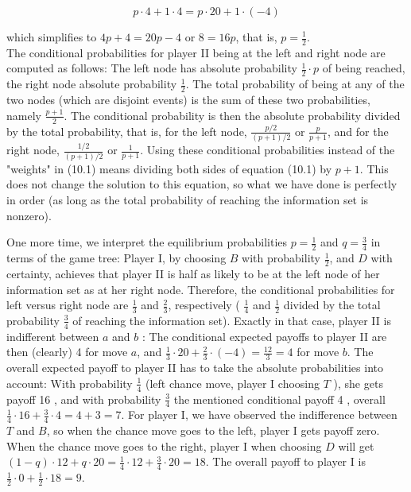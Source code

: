 \documentclass[12pt]{article}
\begin{document}
\begin{equation*}
p \cdot 4+1 \cdot 4=p \cdot 20+1 \cdot(-4) \tag{10.1}
\end{equation*}


which simplifies to $4 p+4=20 p-4$ or $8=16 p$, that is, $p=\frac{1}{2}$.\\
The conditional probabilities for player II being at the left and right node are computed as follows: The left node has absolute probability $\frac{1}{2} \cdot p$ of being reached,\\
the right node absolute probability $\frac{1}{2}$. The total probability of being at any of the two nodes (which are disjoint events) is the sum of these two probabilities, namely $\frac{p+1}{2}$. The conditional probability is then the absolute probability divided by the total probability, that is, for the left node, $\frac{p / 2}{(p+1) / 2}$ or $\frac{p}{p+1}$, and for the right node, $\frac{1 / 2}{(p+1) / 2}$ or $\frac{1}{p+1}$. Using these conditional probabilities instead of the "weights" in (10.1) means dividing both sides of equation (10.1) by $p+1$. This does not change the solution to this equation, so what we have done is perfectly in order (as long as the total probability of reaching the information set is nonzero).

One more time, we interpret the equilibrium probabilities $p=\frac{1}{2}$ and $q=\frac{3}{4}$ in terms of the game tree: Player I, by choosing $B$ with probability $\frac{1}{2}$, and $D$ with certainty, achieves that player II is half as likely to be at the left node of her information set as at her right node. Therefore, the conditional probabilities for left versus right node are $\frac{1}{3}$ and $\frac{2}{3}$, respectively ( $\frac{1}{4}$ and $\frac{1}{2}$ divided by the total probability $\frac{3}{4}$ of reaching the information set). Exactly in that case, player II is indifferent between $a$ and $b$ : The conditional expected payoffs to player II are then (clearly) 4 for move $a$, and $\frac{1}{3} \cdot 20+\frac{2}{3} \cdot(-4)=\frac{12}{3}=4$ for move $b$. The overall expected payoff to player II has to take the absolute probabilities into account: With probability $\frac{1}{4}$ (left chance move, player I choosing $T$ ), she gets payoff 16 , and with probability $\frac{3}{4}$ the mentioned conditional payoff 4 , overall $\frac{1}{4} \cdot 16+\frac{3}{4} \cdot 4=4+3=7$. For player I, we have observed the indifference between $T$ and $B$, so when the chance move goes to the left, player I gets payoff zero. When the chance move goes to the right, player I when choosing $D$ will get $(1-q) \cdot 12+q \cdot 20=\frac{1}{4} \cdot 12+\frac{3}{4} \cdot 20=18$. The overall payoff to player I is $\frac{1}{2} \cdot 0+\frac{1}{2} \cdot 18=9$.
\end{document}
